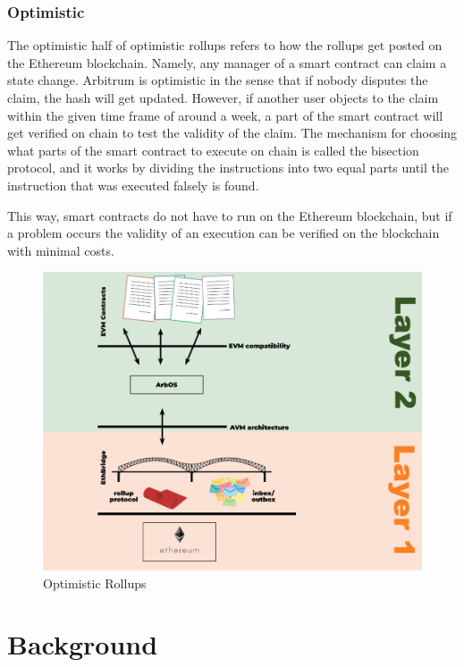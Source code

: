 \documentclass[a4paper,oneside,openright,11pt]{report}
\begin{document}
\subsection{Optimistic}
The optimistic half of optimistic rollups refers to how the rollups get posted on the Ethereum blockchain.
Namely, any manager of a smart contract can claim a state change. Arbitrum is optimistic in
the sense that if nobody disputes the claim, the hash will get updated. However, if another user objects to
the claim within the given time frame of around a week, a part of the smart contract will get verified on
chain to test the validity of the claim. The mechanism for choosing what parts of the smart contract to
execute on chain is called the bisection protocol, and it works by dividing the instructions into two equal parts
until the instruction that was executed falsely is found.

This way, smart contracts do not have to run on the Ethereum blockchain, but if a problem occurs the validity
of an execution can be verified on the blockchain with minimal costs.

\begin{figure}[h]
	\centering
	\includegraphics[scale=0.5]{./Pictures/Optimistic-Rollup.png}
	\caption{Optimistic Rollups}
	\label{fig:Optimistic_Rollups}
\end{figure}
  
\chapter{Background}
\end{document}
